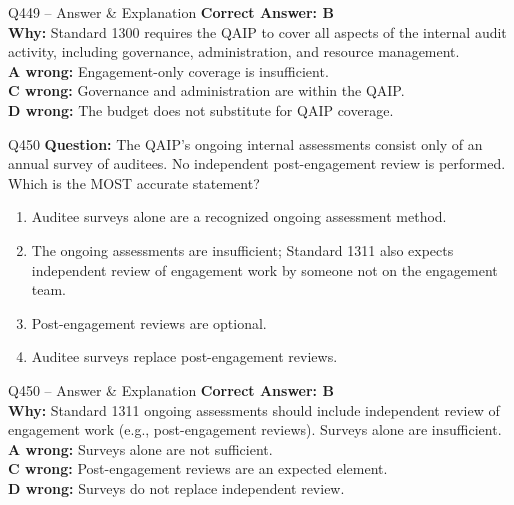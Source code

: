 \documentclass[aspectratio=169,10pt]{beamer}
\begin{document}
	\begin{frame}[t]{Q449 -- Answer \& Explanation}
		\small
		\textbf{Correct Answer: B} \\[4pt]
		\textbf{Why:} Standard 1300 requires the QAIP to cover all aspects of the internal audit activity, including governance, administration, and resource management. \\[4pt]
		\textbf{A wrong:} Engagement-only coverage is insufficient. \\[2pt]
		\textbf{C wrong:} Governance and administration are within the QAIP. \\[2pt]
		\textbf{D wrong:} The budget does not substitute for QAIP coverage.
	\end{frame}
	
	\begin{frame}[t]{Q450}
		\small
		\textbf{Question:} The QAIP's ongoing internal assessments consist only of an annual survey of auditees. No independent post-engagement review is performed. Which is the MOST accurate statement?
		\begin{enumerate}[label=\Alph*.,itemsep=1pt,topsep=2pt]
			\item Auditee surveys alone are a recognized ongoing assessment method.
			\item The ongoing assessments are insufficient; Standard 1311 also expects independent review of engagement work by someone not on the engagement team.
			\item Post-engagement reviews are optional.
			\item Auditee surveys replace post-engagement reviews.
		\end{enumerate}
	\end{frame}
	
	\begin{frame}[t]{Q450 -- Answer \& Explanation}
		\small
		\textbf{Correct Answer: B} \\[4pt]
		\textbf{Why:} Standard 1311 ongoing assessments should include independent review of engagement work (e.g., post-engagement reviews). Surveys alone are insufficient. \\[4pt]
		\textbf{A wrong:} Surveys alone are not sufficient. \\[2pt]
		\textbf{C wrong:} Post-engagement reviews are an expected element. \\[2pt]
		\textbf{D wrong:} Surveys do not replace independent review.
	\end{frame}
	
\end{document}
